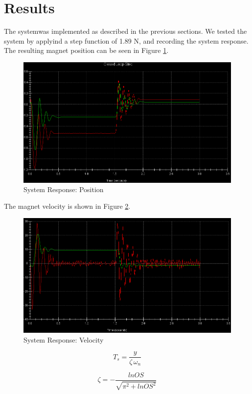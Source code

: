 \section{Results}

The systemwas implemented as described in the previous sections.
We tested the system by applyind a step function of 1.89 N, and recording the system response.
The resulting magnet position can be seen in Figure \ref{fig:position}.

\begin{figure}[h]
    \centering
    \includegraphics[width=1\textwidth]{position}
    \caption{System Response: Position}
    \label{fig:position}
\end{figure}

The magnet velocity is shown in Figure \ref{fig:velocity}.

\begin{figure}[h]
    \centering
    \includegraphics[width=1\textwidth]{velocity}
    \caption{System Response: Velocity}
    \label{fig:velocity}
\end{figure}


\begin{equation}
	\label{eq:settling_time}
	T_{s} = {\frac {y}{\zeta \, \omega_n}}
\end{equation}

\begin{equation}
	\label{eq:overshoot}
	\zeta = -{\frac {ln{OS}}{\sqrt{{\pi}^{2}+{ln{OS}}^{2}}}}
\end{equation}
